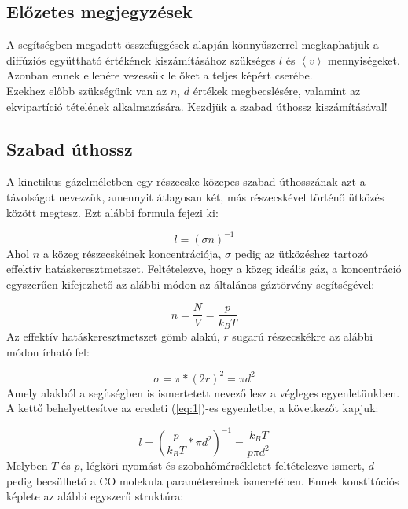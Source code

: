 \subsection{Előzetes megjegyzések} \label{sub:1.2}
A segítségben megadott összefüggések alapján könnyűszerrel megkaphatjuk a diffúziós együttható értékének kiszámításához szükséges $l$ és $\left< v \right>$ mennyiségeket. Azonban ennek ellenére vezessük le őket a teljes képért cserébe. \\
Ezekhez előbb szükségünk van az $n$, $d$ értékek megbecslésére, valamint az ekvipartíció tételének alkalmazására. Kezdjük a szabad úthossz kiszámításával!

\subsection{Szabad úthossz} \label{sub:1.3}
A kinetikus gázelméletben egy részecske közepes szabad úthosszának azt a távolságot nevezzük, amennyit átlagosan két, más részecskével történő ütközés között megtesz. Ezt alábbi formula fejezi ki:

\begin{equation} \label{eq:1}
    l
    =
    \left( \sigma n \right)^{-1}
\end{equation}
Ahol $n$ a közeg részecskéinek koncentrációja, $\sigma$ pedig az ütközéshez tartozó effektív hatáskeresztmetszet. Feltételezve, hogy a közeg ideális gáz, a koncentráció egyszerűen kifejezhető az alábbi módon az általános gáztörvény segítségével:

\begin{equation} \label{eq:2}
    n
    =
    \frac{N}{V} = \frac{p}{k_{B} T}
\end{equation}
Az effektív hatáskeresztmetszet gömb alakú, $r$ sugarú részecskékre az alábbi\cite{meanfreepath} módon írható fel:

\begin{equation} \label{eq:3}
    \sigma
    =
    \pi * \left( 2 r \right)^{2}
    =
    \pi d^{2}
\end{equation}
Amely alakból a segítségben is ismertetett nevező lesz a végleges egyenletünkben. A kettő behelyettesítve az eredeti (\ref{eq:1})-es egyenletbe, a következőt kapjuk:

\begin{equation} \label{eq:4}
    l
    =
    \left( \frac{p}{k_{B} T} * \pi d^{2} \right)^{-1}
    =
    \boxed{\frac{k_{B} T}{p \pi d^{2}}}
\end{equation}
Melyben $T$ és $p$, légköri nyomást és szobahőmérsékletet feltételezve ismert, $d$ pedig becsülhető a CO molekula paramétereinek ismeretében. Ennek konstitúciós képlete az alábbi egyszerű struktúra:

